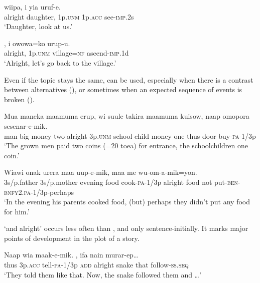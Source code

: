 \ea%
\label{ex:x721}
\gll {} wiipa, i yia uruf-e. \\
alright daughter, 1p.\textsc{unm} 1p.\textsc{acc} see-\textsc{imp}.2s\\
\glt`Daughter, look at us.'
\z

\ea%
\label{ex:x720}
\gll {}, i owowa=ko urup-u. \\
alright, 1p.\textsc{unm} village=\textsc{nf} ascend-\textsc{imp}.1d\\
\glt`Alright, let's go back to the village.'
\z

Even if the topic stays the same,  can be used, especially when there is a contrast between alternatives (), or sometimes when an expected sequence of events is broken ().

\ea%
\label{ex:x719}
\gll Mua maneka maamuma erup,  wi suule takira maamuma kuisow, naap omopora sesenar-e-mik.\\
man big money two alright 3p.\textsc{unm} school child money one thus door buy-\textsc{pa}-1/3p\\
\glt`The grown men paid two coins (=20 toea) for entrance, the schoolchildren one coin.'
\z

\ea%
\label{ex:x722}
\gll Wiawi onak urera maa uup-e-mik,  maa me wu-om-a-mik=yon.\\
3s/p.father 3s/p.mother evening food cook-\textsc{pa}-1/3p alright food not put-\textsc{ben}-\textsc{bnfy}2.\textsc{pa}-1/3p-perhaps\\
\glt`In the evening his parents cooked food, (but) perhaps they didn't put any food for him.'
\z

 `and alright' occurs less often than , and only sentence-initially. It marks major points of development in the plot of a story. 

\ea%
\label{ex:x723}
\gll Naap wia maak-e-mik.  , ifa nain murar-ep{\dots} \\
thus 3p.\textsc{acc} tell-\textsc{pa}-1/3p \textsc{add} alright snake that follow-\textsc{ss}.\textsc{seq}\\
\glt`They told them like that. Now, the snake followed them and {\dots}'
\z

